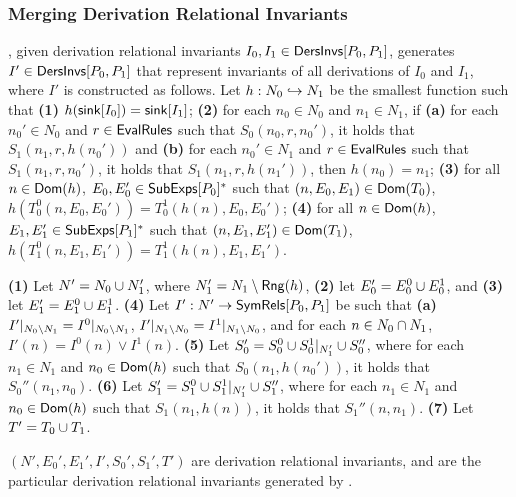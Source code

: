 \subsubsection{Merging Derivation Relational Invariants}
%
\mergeinvs, given derivation relational invariants $I_0, I_1 \in
\mathsf{DersInvs}[ P_0, P_1 ]$, generates $I' \in \mathsf{DersInvs}[ P_0, P_1 ]$ that
represent invariants of all derivations of $I_0$ and $I_1$,
where $I'$ is constructed as follows.
Let $h : N_0 \hookrightarrow N_1$ be the smallest function such that %
\textbf{(1)} $h(\mathsf{sink}[ I_0 ]) = \mathsf{sink}[ I_1 ]$; %
\textbf{(2)} for each $n_0 \in N_0$ and $n_1 \in N_1$, if \textbf{(a)}
for each $n_0' \in N_0$ and $r \in \mathsf{EvalRules}$ such that $S_0(n_0, r,
n_0')$, it holds that $S_1(n_1, r, h(n_0'))$ and %
\textbf{(b)} for each $n_0' \in N_1$ and $r \in \mathsf{EvalRules}$ such that
$S_1(n_1, r, n_0')$, it holds that $S_1(n_1, r, h(n_1'))$, then
$h(n_0) = n_1$; 
\textbf{(3)} for all $n \in \mathsf{Dom}(h)$, $E_0, E_0' \in
\mathsf{SubExps}[ P_0 ]^{*}$ such that $(n, E_0, E_1) \in \mathsf{Dom}(T_0)$,
$h(T_0^0(n, E_0, E_0')) = T_0^1(h(n), E_0, E_0')$;
\textbf{(4)} for all $n \in \mathsf{Dom}(h)$, $E_1, E_1' \in
\mathsf{SubExps}[ P_1 ]^{*}$ such that $(n, E_1, E_1') \in \mathsf{Dom}(T_1)$,
$h(T_1^0(n, E_1, E_1')) = T_1^1(h(n), E_1, E_1')$.

\textbf{(1)} Let $N' = N_0 \cup N_1'$, where $N_1' = N_1 \setminus
\mathsf{Rng}(h)$,
\textbf{(2)} let $E_0' = E_0^0 \cup E_0^1$, and
\textbf{(3)} let $E_1' = E_1^0 \cup E_1^1$.
\textbf{(4)} Let $I' : N' \to \mathsf{SymRels}[ P_0, P_1 ]$ be such that %
\textbf{(a)} $I'|_{N_0 \setminus N_1} = I^0|_{N_0
  \setminus N_1}$, %
$I'|_{N_1 \setminus N_0} = I^1|_{N_1
  \setminus N_0}$, and %
for each $n \in N_0 \cap N_1$, $I'(n) = I^0(n) \lor
I^1(n)$.
\textbf{(5)} Let $S_0' = S_0^0 \cup S_0^1|_{N_1'} \cup
S_0''$, where for each $n_1 \in N_1$ and $n_0 \in \mathsf{Dom}(h)$ such
that $S_0(n_1, h(n_0'))$, it holds that $S_0''(n_1, n_0)$.
\textbf{(6)} Let $S_1' = S_1^0 \cup S_1^1|_{N_1'} \cup
S_1''$, where for each $n_1 \in N_1$ and $n_0 \in \mathsf{Dom}(h)$ such
that $S_1(n_1, h(n))$, it holds that $S_1''(n, n_1)$.
\textbf{(7)} Let $T' = T_0 \cup T_1$.

$(N', E_0', E_1', I', S_0', S_1', T')$ are derivation relational
invariants, and are the particular derivation relational invariants
generated by \mergeinvs.

